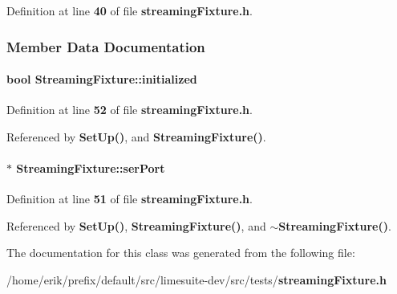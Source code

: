 Definition at line {\bf 40} of file {\bf streaming\+Fixture.\+h}.



\subsubsection{Member Data Documentation}
\paragraph[{initialized}]{\setlength{\rightskip}{0pt plus 5cm}bool Streaming\+Fixture\+::initialized}\label{classStreamingFixture_a01f1098aa337fcc72f79c4cb7c4b3d58}


Definition at line {\bf 52} of file {\bf streaming\+Fixture.\+h}.



Referenced by {\bf Set\+Up()}, and {\bf Streaming\+Fixture()}.

\paragraph[{ser\+Port}]{$\ast$ Streaming\+Fixture\+::ser\+Port}\label{classStreamingFixture_a4988019f5b287a37d526fe4b4c567e6e}


Definition at line {\bf 51} of file {\bf streaming\+Fixture.\+h}.



Referenced by {\bf Set\+Up()}, {\bf Streaming\+Fixture()}, and {\bf $\sim$\+Streaming\+Fixture()}.



The documentation for this class was generated from the following file\+:\begin{DoxyCompactItemize}
\item 
/home/erik/prefix/default/src/limesuite-\/dev/src/tests/{\bf streaming\+Fixture.\+h}\end{DoxyCompactItemize}
